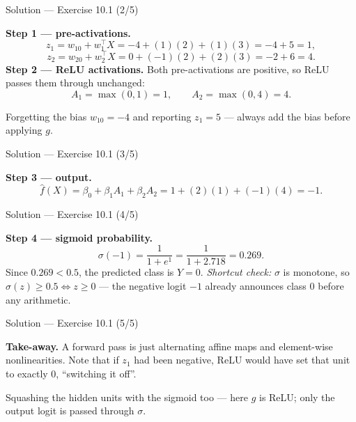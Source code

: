 \documentclass[aspectratio=169,11pt]{beamer}
\begin{document}
\begin{frame}{Solution --- Exercise 10.1 (2/5)}
\begin{solutionbox}
  \medskip
  \textbf{Step 1 --- pre-activations.}
  \[
    z_1 = w_{10} + w_1^\top X = -4 + (1)(2) + (1)(3) = -4 + 5 = 1,
  \]
  \[
    z_2 = w_{20} + w_2^\top X = 0 + (-1)(2) + (2)(3) = -2 + 6 = 4 .
  \]
  \textbf{Step 2 --- ReLU activations.} Both pre-activations are positive,
  so ReLU passes them through unchanged:
  \[
    A_1 = \max(0, 1) = 1, \qquad A_2 = \max(0, 4) = 4 .
  \]
\end{solutionbox}
\begin{mistake}
  Forgetting the bias $w_{10} = -4$ and reporting $z_1 = 5$ --- always add the
  bias before applying $g$.
\end{mistake}
\end{frame}

\begin{frame}{Solution --- Exercise 10.1 (3/5)}
\begin{solutionbox}
  \textbf{Step 3 --- output.}
  \[
    \hat f(X) = \beta_0 + \beta_1 A_1 + \beta_2 A_2
             = 1 + (2)(1) + (-1)(4) = -1 .
  \]
\end{solutionbox}
\end{frame}

\begin{frame}{Solution --- Exercise 10.1 (4/5)}
\begin{solutionbox}
  \textbf{Step 4 --- sigmoid probability.}
  \[
    \sigma(-1) = \frac{1}{1 + e^{1}} = \frac{1}{1 + 2.718} = 0.269 .
  \]
  Since $0.269 < 0.5$, the predicted class is $Y = 0$.
  \emph{Shortcut check:} $\sigma$ is monotone, so
  $\sigma(z) \ge 0.5 \iff z \ge 0$ --- the negative logit $-1$ already
  announces class $0$ before any arithmetic.
\end{solutionbox}
\end{frame}

\begin{frame}{Solution --- Exercise 10.1 (5/5)}
\begin{solutionbox}
  \medskip
  \textbf{Take-away.} A forward pass is just alternating affine maps
  and element-wise nonlinearities. Note that if $z_1$ had been
  negative, ReLU would have set that unit to exactly $0$, ``switching
  it off''.

\end{solutionbox}
\begin{mistake}
  Squashing the hidden units with the sigmoid too --- here $g$ is ReLU; only the
  output logit is passed through $\sigma$.
\end{mistake}
\end{frame}
\end{document}
